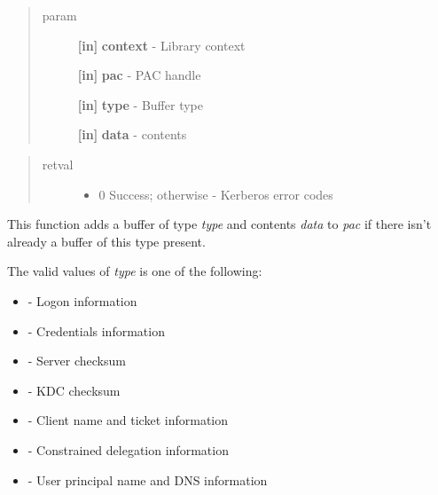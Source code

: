 \documentclass[letterpaper,10pt,english]{sphinxmanual}
\begin{document}
\begin{quote}\begin{description}
\item[{param}] \leavevmode
\textbf{{[}in{]}} \textbf{context} - Library context

\textbf{{[}in{]}} \textbf{pac} - PAC handle

\textbf{{[}in{]}} \textbf{type} - Buffer type

\textbf{{[}in{]}} \textbf{data} - contents

\end{description}\end{quote}
\begin{quote}\begin{description}
\item[{retval}] \leavevmode\begin{itemize}
\item {} 
0   Success; otherwise - Kerberos error codes

\end{itemize}

\end{description}\end{quote}

This function adds a buffer of type \emph{type} and contents \emph{data} to \emph{pac} if there isn't already a buffer of this type present.

The valid values of \emph{type} is one of the following:
\begin{itemize}
\item {} 
{\hyperref[appdev/refs/macros/KRB5_PAC_LOGON_INFO:KRB5_PAC_LOGON_INFO]{}} - Logon information

\item {} 
{\hyperref[appdev/refs/macros/KRB5_PAC_CREDENTIALS_INFO:KRB5_PAC_CREDENTIALS_INFO]{}} - Credentials information

\item {} 
{\hyperref[appdev/refs/macros/KRB5_PAC_SERVER_CHECKSUM:KRB5_PAC_SERVER_CHECKSUM]{}} - Server checksum

\item {} 
{\hyperref[appdev/refs/macros/KRB5_PAC_PRIVSVR_CHECKSUM:KRB5_PAC_PRIVSVR_CHECKSUM]{}} - KDC checksum

\item {} 
{\hyperref[appdev/refs/macros/KRB5_PAC_CLIENT_INFO:KRB5_PAC_CLIENT_INFO]{}} - Client name and ticket information

\item {} 
{\hyperref[appdev/refs/macros/KRB5_PAC_DELEGATION_INFO:KRB5_PAC_DELEGATION_INFO]{}} - Constrained delegation information

\item {} 
{\hyperref[appdev/refs/macros/KRB5_PAC_UPN_DNS_INFO:KRB5_PAC_UPN_DNS_INFO]{}} - User principal name and DNS information

\end{itemize}
\end{document}
